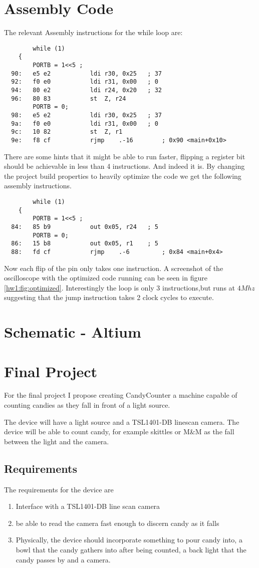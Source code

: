 \documentclass{article}
\begin{document}
\section{Assembly Code}

The relevant Assembly instructions for the while loop are:

\begin{verbatim}
    	while (1)
	{
		PORTB = 1<<5 ;
  90:	e5 e2       	ldi	r30, 0x25	; 37
  92:	f0 e0       	ldi	r31, 0x00	; 0
  94:	80 e2       	ldi	r24, 0x20	; 32
  96:	80 83       	st	Z, r24
		PORTB = 0;
  98:	e5 e2       	ldi	r30, 0x25	; 37
  9a:	f0 e0       	ldi	r31, 0x00	; 0
  9c:	10 82       	st	Z, r1
  9e:	f8 cf       	rjmp	.-16     	; 0x90 <main+0x10>

\end{verbatim}
There are some hints that it might be able to run faster, flipping a register bit should be achievable in less than 4 instructions. And indeed it is. By changing the project build properties to heavily optimize the code we get the following assembly instructions.

\begin{verbatim}
    	while (1)
	{
		PORTB = 1<<5 ;
  84:	85 b9       	out	0x05, r24	; 5
		PORTB = 0;
  86:	15 b8       	out	0x05, r1	; 5
  88:	fd cf       	rjmp	.-6      	; 0x84 <main+0x4>
\end{verbatim}

Now each flip of the pin only takes one instruction. A screenshot of the oscilloscope with the optimized code running can be seen in figure \ref{hw1:fig:optimized}. Interestingly the loop is only 3 instructions,but runs at $4 Mhz$ suggesting that the jump instruction takes 2 clock cycles to execute.  
\section{Schematic - Altium}


\section{Final Project}
For the final project I propose creating CandyCounter a machine capable of counting candies as they fall in front of a light source.

The device will have a light source and a TSL1401-DB linescan camera. The device will be able to count candy, for example skittles or M&M as the fall between the light and the camera.

\subsection{Requirements}
The requirements for the device are
\begin{enumerate}
    \item Interface with a TSL1401-DB line scan camera
    \item be able to read the camera fast enough to discern candy as it falls
    \item Physically, the device should incorporate something to pour candy into, a bowl that the candy gathers into after being counted, a back light that the candy passes by and a camera.
\end{enumerate}
\end{document}
